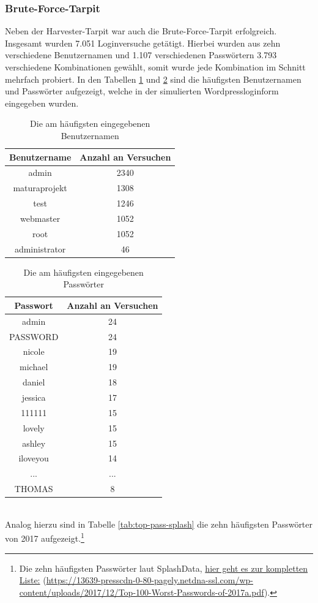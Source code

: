 \subsubsection{Brute-Force-Tarpit}
Neben der Harvester-Tarpit war auch die Brute-Force-Tarpit erfolgreich. Insgesamt wurden 7.051 Loginversuche getätigt. Hierbei wurden aus zehn verschiedene Benutzernamen und 1.107 verschiedenen Passwörtern 3.793 verschiedene Kombinationen gewählt, somit wurde jede Kombination im Schnitt mehrfach probiert. In den Tabellen \ref{tab:top-ben} und \ref{tab:top-pass} sind die häufigsten Benutzernamen und Passwörter aufgezeigt, welche in der simulierten Wordpressloginform eingegeben wurden.
\begin{table}[htb!]
	\centering
	\begin{tabular}{c|c}
		\textbf{Benutzername}&\textbf{Anzahl an Versuchen}\\\hline
		admin & 2340\\
		maturaprojekt & 1308\\
		test & 1246 \\
		webmaster & 1052\\
		root & 1052 \\
		administrator & 46 \\
	\end{tabular}
	\caption{Die am häufigsten eingegebenen Benutzernamen}
	\label{tab:top-ben}
\end{table}
\begin{table}[htb!]
	\centering
	\begin{tabular}{c|c}
		\textbf{Passwort}&\textbf{Anzahl an Versuchen}\\\hline
		admin & 24\\
		PASSWORD & 24\\
		nicole & 19\\
		michael & 19\\
		daniel & 18\\
		jessica & 17\\
		111111 & 15\\
		lovely & 15\\
		ashley & 15\\
		iloveyou & 14\\
		... & ...\\
		THOMAS & 8\\
	\end{tabular}
	\caption{Die am häufigsten eingegebenen Passwörter}
	\label{tab:top-pass}
\end{table}
\\Analog hierzu sind in Tabelle \ref{tab:top-pass-splash} die zehn häufigsten Passwörter von 2017 aufgezeigt.\footnote{Die zehn häufigsten Passwörter laut SplashData, \href{https://13639-presscdn-0-80-pagely.netdna-ssl.com/wp-content/uploads/2017/12/Top-100-Worst-Passwords-of-2017a.pdf}{hier geht es zur kompletten Liste:} (\url{https://13639-presscdn-0-80-pagely.netdna-ssl.com/wp-content/uploads/2017/12/Top-100-Worst-Passwords-of-2017a.pdf}).}

